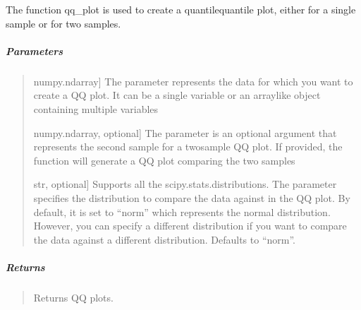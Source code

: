 \documentclass[letterpaper,10pt,english,openany,oneside]{sphinxmanual}
\begin{document}
\begin{fulllineitems}
\label{\detokenize{api_reference/generated/QuadratiK.tools.qq_plot:QuadratiK.tools.qq_plot}}
\pysigstartsignatures
{}
\pysigstopsignatures
\sphinxAtStartPar
The function qq\_plot is used to create a quantile\sphinxhyphen{}quantile plot, 
either for a single sample or for two samples.


\subparagraph{Parameters}
\label{\detokenize{api_reference/generated/QuadratiK.tools.qq_plot:parameters}}\begin{quote}
\begin{description}
\sphinxlineitem{x}{[}numpy.ndarray{]}
\sphinxAtStartPar
The  parameter represents the data for which you want to 
create a QQ plot. It can be a single variable or an array\sphinxhyphen{}like 
object containing multiple variables

\sphinxlineitem{y}{[}numpy.ndarray, optional{]}
\sphinxAtStartPar
The parameter  is an optional argument that represents the second 
sample for a two\sphinxhyphen{}sample QQ plot. If provided, the function will generate 
a QQ plot comparing the two samples

\sphinxlineitem{dist}{[}str, optional{]}
\sphinxAtStartPar
Supports all the scipy.stats.distributions. The  parameter specifies
the distribution to compare the data against in the QQ plot. By default, 
it is set to “norm” which represents the normal distribution. However, you can 
specify a different distribution if you want to compare the data against
a different distribution. Defaults to “norm”.

\end{description}
\end{quote}


\subparagraph{Returns}
\label{\detokenize{api_reference/generated/QuadratiK.tools.qq_plot:returns}}\begin{quote}

\sphinxAtStartPar
Returns QQ plots.
\end{quote}



\end{fulllineitems}
\end{document}
